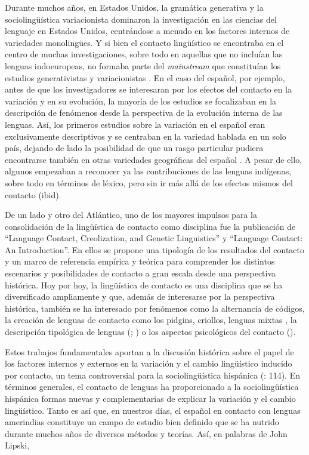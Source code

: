\documentclass[output=paper]{langscibook}
\begin{document}
Durante muchos años,  en Estados Unidos, la gramática generativa y la sociolingüística variacionista dominaron la investigación en las ciencias del lenguaje en Estados Unidos, centrándose a menudo en los factores internos de variedades monolingües. Y si bien el contacto lingüístico se encontraba en el centro de muchas investigaciones, sobre todo en aquellas que no incluían las lenguas indoeuropeas, no formaba parte del \textit{mainstream} que constituían los estudios generativistas y variacionistas \citep[1]{Hickey2010}. En el caso del español, por ejemplo, antes de que los investigadores se interesaran por los efectos del contacto en la variación y en su evolución, la mayoría de los estudios se focalizaban en la descripción de fenómenos desde la perspectiva de la evolución interna de las lenguas. Así, los primeros estudios sobre la variación en el español eran exclusivamente descriptivos y se centraban en la variedad hablada en un solo país, dejando de lado la posibilidad de que un rasgo particular pudiera encontrarse también en otras variedades geográficas del español \citep{Lipski2007}. A pesar de ello, algunos empezaban a reconocer ya las contribuciones de las lenguas indígenas, sobre todo en términos de léxico, pero sin ir más allá de los efectos mismos del contacto (ibid).

De un lado y otro del Atlántico, uno de los mayores impulsos para la consolidación de la lingüística de contacto como disciplina fue la publicación de  \citet{ThomasonKaufman1988} “Language Contact, Creolization, and Genetic Linguistics” y \citet{Thomason2001} “Language Contact: An Introduction”. En ellos se propone una tipología de los resultados del contacto y un marco de referencia empírica y teórica para comprender los distintos escenarios y posibilidades de contacto a gran escala desde una perspectiva histórica. Hoy por hoy, la lingüística de contacto es una disciplina que se ha diversificado ampliamente y que, además de interesarse por la perspectiva histórica, también se ha interesado por fenómenos como la alternancia de códigos, la creación de lenguas de contacto como los pidgins, criollos, lenguas mixtas \citep{Winford2003book}, la descripción tipológica de lenguas (\citealt{Ross1996}; \citealt{Matras2009}) o los aspectos psicológicos del contacto (\citealt{VanCoetsem1988,VanCoetsem2000}).

Estos trabajos fundamentales aportan a la discusión histórica sobre el papel de los factores internos y externos en la variación y el cambio lingüístico inducido por contacto, un tema controversial para la sociolingüística hispánica (\citealt{KleeLynch2009indigenas}: 114). En términos generales, el contacto de lenguas ha proporcionado a la sociolingüística hispánica formas nuevas y complementarias de explicar la variación y el cambio lingüístico. Tanto es así que, en nuestros días, el español en contacto con lenguas amerindias constituye un campo de estudio bien definido que se ha nutrido durante muchos años de diversos métodos y teorías. Así, en palabras de John Lipski,
\end{document}
